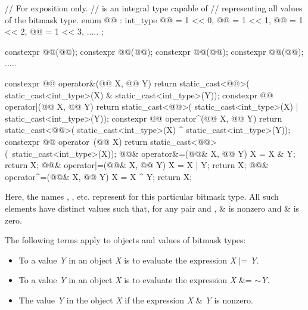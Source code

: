 \begin{codeblock}
// For exposition only.
//  is an integral type capable of
// representing all values of the bitmask type.
enum @@ : int_type {
  @@ = 1 << 0, @@ = 1 << 1, @@ = 1 << 2, @@ = 1 << 3, .....
};

constexpr @@(@@);
constexpr @@(@@);
constexpr @@(@@);
constexpr @@(@@);
  .....

constexpr @@ operator&(@@ X, @@ Y) {
  return static_cast<@@>(
    static_cast<int_type>(X) & static_cast<int_type>(Y));
}
constexpr @@ operator|(@@ X, @@ Y) {
  return static_cast<@@>(
    static_cast<int_type>(X) | static_cast<int_type>(Y));
}
constexpr @@ operator^(@@ X, @@ Y){
  return static_cast<@@>(
    static_cast<int_type>(X) ^ static_cast<int_type>(Y));
}
constexpr @@ operator~(@@ X){
  return static_cast<@@>(~static_cast<int_type>(X));
}
@@& operator&=(@@& X, @@ Y){
  X = X & Y; return X;
}
@@& operator|=(@@& X, @@ Y) {
  X = X | Y; return X;
}
@@& operator^=(@@& X, @@ Y) {
  X = X ^ Y; return X;
}
\end{codeblock}

\pnum
Here, the names , , etc. represent
for this particular bitmask type.
%
All such elements have distinct values such that, for any pair 
and ,  \&  is nonzero and
 \&  is zero.

\pnum
The following terms apply to objects and values of
bitmask types:

\begin{itemize}
\item
To
a value \textit{Y} in an object \textit{X}
is to evaluate the expression \textit{X} $|$= \textit{Y}.
\item
To
a value \textit{Y} in an object
\textit{X} is to evaluate the expression \textit{X} \&= $\sim$\textit{Y}.
\item
The value \textit{Y}
in the object
\textit{X} if the expression \textit{X} \& \textit{Y} is nonzero.
\end{itemize}

